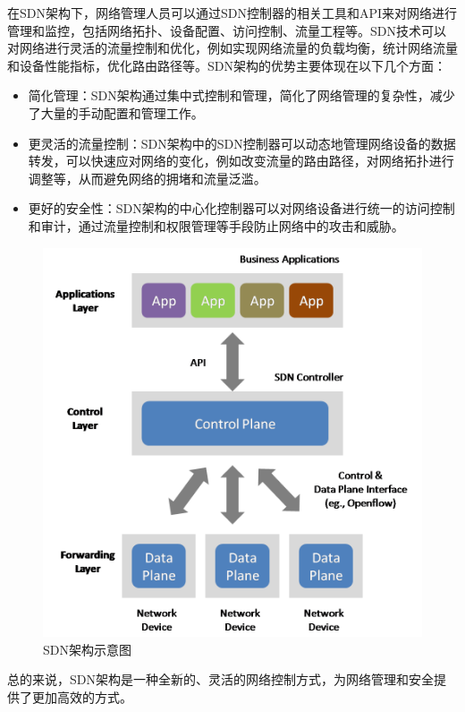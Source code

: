 \begin{multicols}{2}
在SDN架构下，网络管理人员可以通过SDN控制器的相关工具和API来对网络进行管理和监控，包括网络拓扑、设备配置、访问控制、流量工程等。SDN技术可以对网络进行灵活的流量控制和优化，例如实现网络流量的负载均衡，统计网络流量和设备性能指标，优化路由路径等。SDN架构的优势主要体现在以下几个方面：
\begin{itemize}
	\item 简化管理：SDN架构通过集中式控制和管理，简化了网络管理的复杂性，减少了大量的手动配置和管理工作。
	
	\item 更灵活的流量控制：SDN架构中的SDN控制器可以动态地管理网络设备的数据转发，可以快速应对网络的变化，例如改变流量的路由路径，对网络拓扑进行调整等，从而避免网络的拥堵和流量泛滥。
	
	\item 更好的安全性：SDN架构的中心化控制器可以对网络设备进行统一的访问控制和审计，通过流量控制和权限管理等手段防止网络中的攻击和威胁。
\end{itemize}

\begin{figure}[H]
	\centering
	\includegraphics[width=0.95\linewidth]{pics/SDN.png}
	\caption{SDN架构示意图}
	\label{fig:1}
\end{figure}

总的来说，SDN架构是一种全新的、灵活的网络控制方式，为网络管理和安全提供了更加高效的方式。


\end{multicols}
